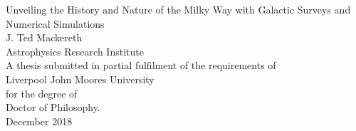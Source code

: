 \documentclass[a4paper, 12pt, titlepage]{report}
\newcommand{\ThesisTitle}{Unveiling the History and Nature of the Milky Way with Galactic Surveys and Numerical Simulations}
\newcommand{\AuthorName}{J. Ted Mackereth}
\newcommand{\SubmissionDate}{December 2018}
\begin{document}
\begin{titlepage}
  \pagestyle{plain}
    \begin{center}
      \vspace*{-20mm}
        \LARGE{\sc \ThesisTitle}\\
        \vspace*{30mm}
        \LARGE{\AuthorName}\\
        \large{Astrophysics Research Institute}\\
        \vspace{9.0cm}
        \normalsize{
          A thesis submitted in partial fulfilment of the requirements of\\
          Liverpool John Moores University\\
          for the degree of\\
          Doctor of Philosophy.\\
          \SubmissionDate
        }
    \end{center}
\end{titlepage}





\pagestyle{plain}
\setcounter{page}{2}


\newpage

\newpage

\newpage

\newpage


\newpage
{}
\hypersetup{linkcolor=black}
\tableofcontents


\newpage
{}
\listoftables
\newpage
{}
\listoffigures
\hypersetup{linkcolor=blue}
\newpage





\pagestyle{lxh}








\let\svaddcontentsline\addcontentsline
\renewcommand\addcontentsline[3]{%
  \ifthenelse{\equal{#1}{lof}}{}%
  {\ifthenelse{\equal{#1}{lot}}{}{\svaddcontentsline{#1}{#2}{#3}}}}
\end{document}
